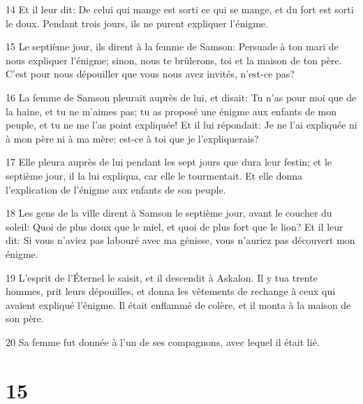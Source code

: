 \par 14 Et il leur dit: De celui qui mange est sorti ce qui se mange, et du fort est sorti le doux. Pendant trois jours, ils ne purent expliquer l'énigme.
\par 15 Le septième jour, ils dirent à la femme de Samson: Persuade à ton mari de nous expliquer l'énigme; sinon, nous te brûlerons, toi et la maison de ton père. C'est pour nous dépouiller que vous nous avez invités, n'est-ce pas?
\par 16 La femme de Samson pleurait auprès de lui, et disait: Tu n'as pour moi que de la haine, et tu ne m'aimes pas; tu as proposé une énigme aux enfants de mon peuple, et tu ne me l'as point expliquée! Et il lui répondait: Je ne l'ai expliquée ni à mon père ni à ma mère; est-ce à toi que je l'expliquerais?
\par 17 Elle pleura auprès de lui pendant les sept jours que dura leur festin; et le septième jour, il la lui expliqua, car elle le tourmentait. Et elle donna l'explication de l'énigme aux enfants de son peuple.
\par 18 Les gens de la ville dirent à Samson le septième jour, avant le coucher du soleil: Quoi de plus doux que le miel, et quoi de plus fort que le lion? Et il leur dit: Si vous n'aviez pas labouré avec ma génisse, vous n'auriez pas découvert mon énigme.
\par 19 L'esprit de l'Éternel le saisit, et il descendit à Askalon. Il y tua trente hommes, prit leurs dépouilles, et donna les vêtements de rechange à ceux qui avaient expliqué l'énigme. Il était enflammé de colère, et il monta à la maison de son père.
\par 20 Sa femme fut donnée à l'un de ses compagnons, avec lequel il était lié.

\chapter{15}

